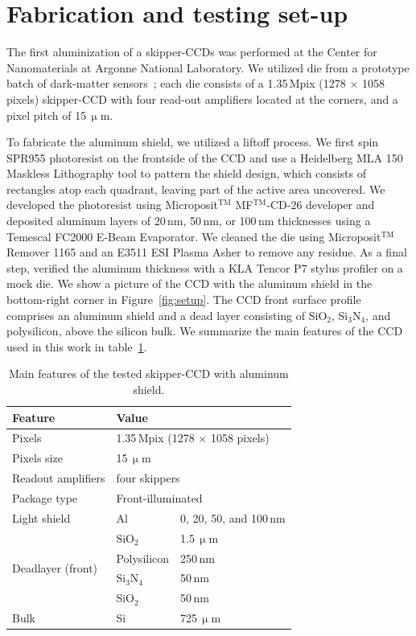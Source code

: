 \documentclass[twocolumn]{aastex631}
\begin{document}
\section{Fabrication and testing set-up} \label{sec:fab}

The first aluminization of a skipper-CCDs was performed at the Center for Nanomaterials at Argonne National Laboratory. We utilized die from a prototype batch of dark-matter sensors~\cite{oscurasensors}; each die consists of a 1.35\,Mpix (1278 $\times$ 1058 pixels) skipper-CCD with four read-out amplifiers located at the corners, and a pixel pitch of 15\,$\upmu$m.

To fabricate the aluminum shield, we utilized a liftoff process. We first spin SPR955 photoresist on the frontside of the CCD and use a Heidelberg MLA 150 Maskless Lithography tool to pattern the shield design, which consists of rectangles atop each quadrant, leaving part of the active area uncovered. We developed the photoresist using Microposit$^\mathrm{TM}$ MF$^\mathrm{TM}$-CD-26 developer and deposited aluminum layers of 20\,nm, 50\,nm, or 100\,nm thicknesses using a Temescal FC2000 E-Beam Evaporator. We cleaned the die using Microposit$^\mathrm{TM}$ Remover 1165 and an E3511 ESI Plasma Asher to remove any residue. As a final step, verified the aluminum thickness with a KLA Tencor P7 stylus profiler on a mock die. We show a picture of the CCD with the aluminum shield in the bottom-right corner in Figure~\ref{fig:setup}. The CCD front surface profile comprises an aluminum shield and a dead layer consisting of SiO$_2$, Si$_3$N$_4$, and polysilicon, above the silicon bulk. We summarize the main features of the CCD used in this work in table~\ref{table:CCDspecs}.


\begin{table}
\centering
\begin{tabular}{l l l}
\toprule
Feature & \multicolumn{2}{l}{Value} \\
\midrule
Pixels & \multicolumn{2}{l}{1.35\,Mpix (1278 $\times$ 1058 pixels)} \\
Pixels size & \multicolumn{2}{l}{15\,$\upmu$m} \\
Readout amplifiers & \multicolumn{2}{l}{four skippers} \\
Package type & \multicolumn{2}{l}{Front-illuminated} \\
Light shield & Al & 0, 20, 50, and 100\,nm \\
\multirow{4}{*}{Deadlayer (front)} 
& SiO$_2$ & 1.5\,$\upmu$m \\
& Polysilicon & 250\,nm \\
& Si$_3$N$_4$ & 50\,nm \\
& SiO$_2$ & 50\,nm \\
Bulk & Si & 725\,$\upmu$m \\
 \bottomrule
\end{tabular}
 \caption{Main features of the tested skipper-CCD with aluminum shield. }
 \label{table:CCDspecs}
\end{table}
\end{document}
